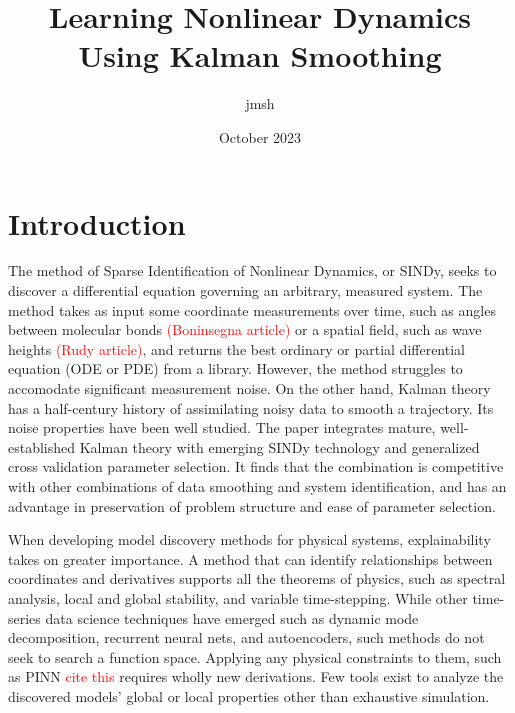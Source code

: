 \documentclass{article}
\title{Learning Nonlinear Dynamics Using Kalman Smoothing}
\author{jmsh}
\date{October 2023}
\newcommand{\red}[1]{\textcolor{red}{#1}}
\begin{document}
\maketitle


\section{Introduction}
The method of Sparse Identification of Nonlinear Dynamics, or SINDy, seeks to discover a differential equation governing an arbitrary, measured system.  The method takes as input some coordinate measurements over time, such as angles between molecular bonds \red{(Boninsegna article)} or a spatial field, such as wave heights \red{(Rudy article)}, and returns the best ordinary or partial differential equation (ODE or PDE) from a library.  However, the method struggles to accomodate significant measurement noise.  On the other hand, Kalman theory has a half-century history of assimilating noisy data to smooth a trajectory.  Its noise properties have been well studied. The paper integrates mature, well-established Kalman theory with emerging SINDy technology and generalized cross validation parameter selection.  It finds that the combination is competitive with other combinations of data smoothing and system identification, and has an advantage in preservation of problem structure and ease of parameter selection.

When developing model discovery methods for physical systems, explainability takes on greater importance. A method that can identify relationships between coordinates and derivatives supports all the theorems of physics, such as spectral analysis, local and global stability, and variable time-stepping.  While other time-series data science techniques have emerged such as dynamic mode decomposition, recurrent neural nets, and autoencoders, such methods do not seek to search a function space.  Applying any physical constraints to them, such as PINN \red{cite this} requires wholly new derivations.  Few tools exist to analyze the discovered models' global or local properties other than exhaustive simulation.
\end{document}
